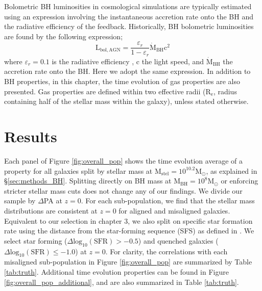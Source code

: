 Bolometric BH luminosities in cosmological simulations are typically estimated using an expression involving the instantaneous accretion rate onto the BH and the radiative efficiency of the feedback. Historically, BH bolometric luminosities are found by the following expression;
\begin{equation}
\mathrm{L_{bol, AGN}} = \frac{\varepsilon_r}{1 - \varepsilon_r} \dot{\mathrm{M}}_{\mathrm{BH}} \mathrm{c^2}
\end{equation}
where $\varepsilon_r=0.1$ is the radiative efficiency \citep[see discussion in][]{habouzit2019}, c the light speed, and $\dot{\mathrm{M}}_{\mathrm{BH}}$ the accretion rate onto the BH. Here we adopt the same expression. In addition to BH properties, in this chapter, the time evolution of gas properties are also presented. Gas properties are defined within two effective radii ($\mathrm{R_{e}}$, radius containing half of the stellar mass within the galaxy), unless stated otherwise.

\section{Results} \label{sec:results_BH}
Each panel of Figure \ref{fig:overall_pop} shows the time evolution average of a property for all galaxies split by stellar mass at $\mathrm{M_{stel} = 10^{10.2}M_{\odot}}$, as explained in \S\ref{sec:methods_BH}. Splitting directly on BH mass at $\mathrm{M_{BH} = 10^{8}M_{\odot}}$ or enforcing stricter stellar mass cuts does not change any of our findings. We divide our sample by $\Delta$PA at $z=0$. For each sub-population, we find that the stellar mass distributions are consistent at $z=0$ for aligned and misaligned galaxies. Equivalent to our selection in chapter 3, we also split on specific star formation rate using the distance from the star-forming sequence (SFS) as defined in \citet{pillepich2019}. We select star forming ($\Delta \mathrm{log_{10}(SFR) > -0.5}$) and quenched galaxies ($\Delta \mathrm{log_{10}(SFR) \leq -1.0}$) at $z=0$. For clarity, the correlations with each misaligned sub-population in Figure \ref{fig:overall_pop} are summarized by Table \ref{tab:truth}. Additional time evolution properties can be found in Figure \ref{fig:overall_pop_additional}, and are also summarized in Table \ref{tab:truth}.

